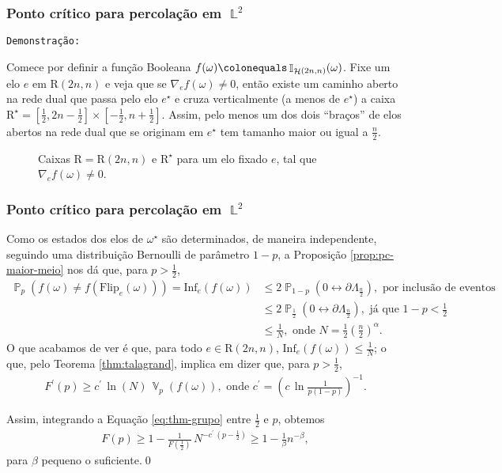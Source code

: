 \documentclass[9pt]{beamer}
\theoremstyle{definition} %
\DeclareMathOperator{\PX}{\mathbb{P}} %
\DeclareMathOperator{\VX}{\mathbb{V}} %
\DeclareMathOperator{\IX}{\mathbb{I}} %
\DeclareMathOperator{\LX}{\mathbb{L}} %
\DeclareMathOperator{\HL}{\mathcal{H}} %
\newcommand{\diffe}{{\nabla_e}f(\omega)}
\newcommand{\flipe}{\text{Flip}_e(\omega)}
\newcommand{\infle}{\text{Inf}_e(f(\omega))}
\begin{document}
	\begin{frame}[t]
		\frametitle{Ponto crítico para percolação em $\LX^2$}
		\texttt{Demonstração:}
		
		Comece por definir a função Booleana $f(\omega) \colonequals \IX_{\HL(2n, n)}(\omega)$. Fixe um elo $e$ em $\text{R}(2n, n)$ e veja que se $\diffe \neq 0$, então existe um caminho aberto na rede dual que passa pelo elo $e^{\star}$ e cruza verticalmente (a menos de $e^{\star}$) a caixa $\text{R}^{\star} = \left[\frac{1}{2}, 2n - \frac{1}{2}\right] \times [-\frac{1}{2}, n + \frac{1}{2}]$. Assim, pelo menos um dos dois ``braços'' de elos abertos na rede dual que se originam em $e^{\star}$ tem tamanho maior ou igual a $\frac{n}{2}$.
		\vspace{-6pt}
		\begin{figure}
			
			\vspace{-9pt}
			\caption{\justifying Caixas $\text{R} = \text{R}(2n, n)$ e $\text{R}^{\star}$ para um elo fixado $e$, tal que $\diffe \neq 0$.}
			\label{fig:caixa-2n}
		\end{figure}
		
	\end{frame}

	\begin{frame}[t]
		\frametitle{Ponto crítico para percolação em $\LX^2$}
		Como os estados dos elos de $\omega^{\star}$ são determinados, de maneira independente, seguindo uma distribuição Bernoulli de parâmetro $1 - p$, a Proposição \ref{prop:pc-maior-meio} nos dá que, para $p > \frac{1}{2}$, 
		\begin{align*}
		\PX_p(f(\omega) \neq f(\flipe)) = \infle &\leq 2\PX_{1-p}\left(0 \leftrightarrow \partial\Lambda_{\frac{n}{2}}\right), \text{ por inclusão de eventos} \\
		&\leq 2\PX_{\frac{1}{2}}\left(0 \leftrightarrow \partial\Lambda_{\frac{n}{2}}\right), \text{ já que $1 - p < \frac{1}{2}$} \\
		&\leq \frac{1}{N}, \text{ onde $N = \frac{1}{2}\left(\frac{n}{2}\right)^{\alpha}$}.
		\end{align*}\pause
		O que acabamos de ver é que, para todo $e \in \text{R}(2n ,n)$, $\infle \leq \frac{1}{N}$; o que, pelo Teorema \ref{thm:talagrand}, implica em dizer que, para $p > \frac{1}{2}$,
		\begin{align}\label{eq:thm-grupo}
		F^{\prime}(p) \geq c^{\prime}\,\ln(N)\,\VX_p(f(\omega)), \text{ onde } c^{\prime} = \left(c\,\ln\frac{1}{p(1-p)}\right)^{-1}.
		\end{align}
		
		Assim, integrando a Equação \ref{eq:thm-grupo} entre $\frac{1}{2}$ e $p$, obtemos
		\begin{align*}
		F(p) \geq 1 - \frac{1}{F\left(\frac{1}{2}\right)} \, N^{-c^{\prime}\,\left(p - \frac{1}{2}\right)} \geq 1 - \frac{1}{\beta} n^{-\beta},
		\end{align*}
		para $\beta$ pequeno o suficiente.\hspace{\fill}\qed
	\end{frame}
\end{document}
